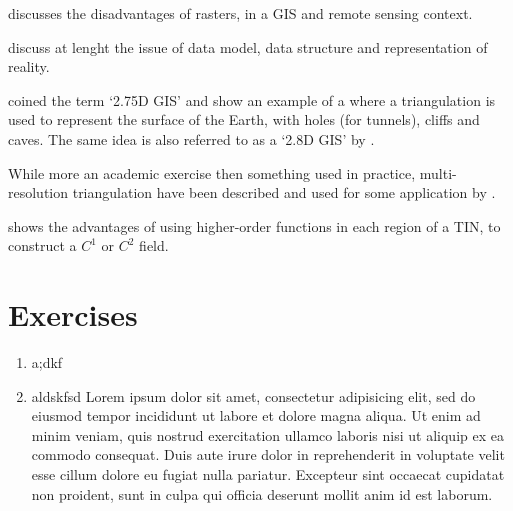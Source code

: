 \citet{Fisher97} discusses the disadvantages of rasters, in a GIS and remote sensing context.

\citet{Frank92,Goodchild92a} discuss at lenght the issue of data model, data structure and representation of reality. 

\citet{Tse04} coined the term `2.75D GIS' and show an example of a where a triangulation is used to represent the surface of the Earth, with holes (for tunnels), cliffs and caves. 
The same idea is also referred to as a `2.8D GIS' by \citet{Groger05}.

While more an academic exercise then something used in practice, multi-resolution triangulation have been described and used for some application by \citet{DeFloriani02}.

\citet{Akima78} shows the advantages of using higher-order functions in each region of a TIN, to construct a $C^1$ or $C^2$ field. 




%
\section{Exercises}

\begin{enumerate}
  \item a;dkf
  \item aldskfsd Lorem ipsum dolor sit amet, consectetur adipisicing elit, sed do eiusmod
  tempor incididunt ut labore et dolore magna aliqua. Ut enim ad minim veniam,
  quis nostrud exercitation ullamco laboris nisi ut aliquip ex ea commodo
  consequat. Duis aute irure dolor in reprehenderit in voluptate velit esse
  cillum dolore eu fugiat nulla pariatur. Excepteur sint occaecat cupidatat non
  proident, sunt in culpa qui officia deserunt mollit anim id est laborum.
\end{enumerate}

